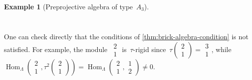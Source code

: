 \documentclass{amsart}
\theoremstyle{definition}
\newtheorem{example}[theorem]{Example}
\newcommand{\Hom}[1]{\operatorname{Hom}_{#1}}
\newcommand{\bsm}{\begin{smallmatrix}}
\newcommand{\esm}{\end{smallmatrix}}
\begin{document}
\begin{example}[Preprojective algebra of type~$A_3$]
\[{\begin{tikzcd}
\end{tikzcd}
}
\]
 
\medskip
One can check directly that the conditions of \cref{thm:brick-algebra-condition} is not satisfied.
For example, the module~$\bsm2\\1\esm$ is~$\tau$-rigid since~$\tau(\bsm2\\1\esm) = \bsm3\\1\esm$, while~$\Hom{\Lambda}\left(\bsm2\\1\esm,\tau^2(\bsm2\\1\esm)\right) = \Hom{\Lambda}(\bsm2\\1\esm,\bsm1\\2\esm) \ne 0$.
\end{example}


%
\end{document}
